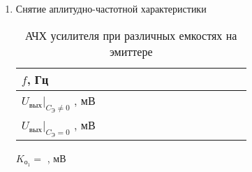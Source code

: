 \begin{enumerate}
\begin{itemize}
\item{$ R_{\text{н}} = $ \hspace{8mm} кОм}


\begin{multicols}{3}

$ U_{\text{вых}_{min}} = $ \hspace{8mm} мВ

$ U_{\text{вх}_{min}} = $ \hspace{8mm} мВ

$ U_{\text{вых}_{max}} = $ \hspace{8mm} мВ

$ U_{\text{вх}_{max}} = $ \hspace{8mm} мВ

$ K_{U_2} = \dfrac{U_{\text{вых}_{min}}}{U_{\text{вх}_{min}}} = $ \hspace{8mm}

\end{multicols}

\end{itemize}

\newpage

\item{Снятие аплитудно-частотной характеристики}

\begin{table} [h!]
  \caption{ АЧХ усилителя при различных емкостях на эмиттере }
  \begin{tabular}{| m{3cm} | m{0.5cm} | m{0.5cm} | m{0.5cm} | m{0.5cm} | m{0.5cm} | m{0.5cm} | m{0.5cm} | m{0.5cm} | m{0.5cm} | m{0.5cm} | m{0.5cm} | m{0.5cm}l |}
    \hline
    \centering $ f $, Гц & & & & & & & & & & & & &\\
    \hline
    \centering $ U_{\text{вых} } |_{C_{\text{Э}} \neq 0 } $ , мВ  & & & & & & & & & & & & &\\
    \hline
    \centering $ U_{\text{вых} } |_{C_{\text{Э}} = 0 } $ , мВ & & & & & & & & & & & & &\\
    \hline
  \end{tabular}
\end{table}

\vspace{8cm}

\begin{figure}[h!t]
\end{figure}

\begin{multicols}{3}

$ K_{\text{о}_1} = $ \hspace{8mm} , мВ


\end{multicols}
\end{enumerate}

